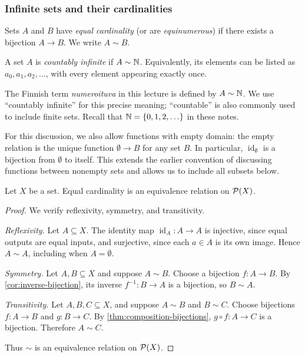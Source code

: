 \documentclass[11pt,a4paper]{amsart}
\begin{document}
\subsubsection{Infinite sets and their cardinalities}

\begin{definition}
  Sets \(A\) and \(B\) have \emph{equal cardinality} (or are
  \emph{equinumerous}) if there exists a bijection \(A\to B\).
  We write \(A\sim B\).
\end{definition}

\begin{definition}
  A set \(A\) is \emph{countably infinite} if \(A\sim\NN\).
  Equivalently, its elements can be listed as
  \(a_0,a_1,a_2,\ldots\), with every element appearing exactly once.
\end{definition}

\begin{remark}
  The Finnish term \emph{numeroituva} in this lecture is defined by
  \(A\sim\NN\). We use ``countably infinite'' for this precise meaning;
  ``countable'' is also commonly used to include finite sets.
  Recall that \(\NN=\set{0,1,2,\ldots}\) in these notes.
\end{remark}

For this discussion, we also allow functions with empty domain: the empty
relation is the unique function \(\emptyset\to B\) for any set \(B\).
In particular, \(\operatorname{id}_{\emptyset}\) is a bijection from
\(\emptyset\) to itself. This extends the earlier convention of discussing
functions between nonempty sets and allows us to include all subsets below.

\begin{theorem}
  Let \(X\) be a set. Equal cardinality is an equivalence relation on
  \(\powerset{X}\).
\end{theorem}

\begin{proof}
  We verify reflexivity, symmetry, and transitivity.

  \emph{Reflexivity.} Let \(A\subseteq X\). The identity map
  \(\operatorname{id}_A\colon A\to A\) is injective, since equal
  outputs are equal inputs, and surjective, since each \(a\in A\)
  is its own image. Hence \(A\sim A\), including when \(A=\emptyset\).

  \emph{Symmetry.} Let \(A,B\subseteq X\) and suppose \(A\sim B\).
  Choose a bijection \(f\colon A\to B\). By
  \cref{cor:inverse-bijection}, its inverse \(f^{-1}\colon B\to A\)
  is a bijection, so \(B\sim A\).

  \emph{Transitivity.} Let \(A,B,C\subseteq X\), and suppose
  \(A\sim B\) and \(B\sim C\). Choose bijections
  \(f\colon A\to B\) and \(g\colon B\to C\).
  By \cref{thm:composition-bijections},
  \(g\circ f\colon A\to C\) is a bijection. Therefore \(A\sim C\).

  Thus \(\sim\) is an equivalence relation on \(\powerset{X}\).
\end{proof}
\end{document}
